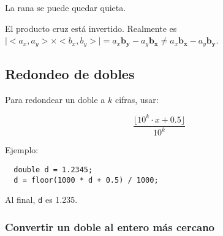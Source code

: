 \documentclass[10pt,letterpaper,twocolumn]{article}
\begin{document}
\begin{itemize}
  \begin{item}
    La rana se puede quedar quieta.
  \end{item}
  
  \begin{item}
    El producto cruz está invertido. Realmente es $\mid<a_x, a_y> \times <b_x, b_y>\mid = a_x \mathbf{b_y} - a_y \mathbf{b_x} \neq a_x \mathbf{b_x} - a_y \mathbf{b_y} $.
  \end{item}
\end{itemize}

\subsection{Redondeo de dobles}

Para redondear un doble a $k$ cifras, usar:

$$ \frac{\lfloor 10^{k} \cdot x + 0.5 \rfloor }{10^k} $$

Ejemplo:

\begin{verbatim}
  double d = 1.2345;
  d = floor(1000 * d + 0.5) / 1000;
\end{verbatim}

Al final, \verb_d_ es 1.235.

\subsubsection{Convertir un doble al entero más cercano}
\end{document}
